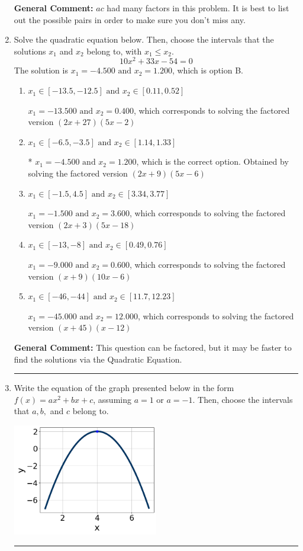 \documentclass{extbook}[14pt]
\newcommand{\litem}[1]{\item #1

\rule{\textwidth}{0.4pt}}
\begin{document}
\begin{enumerate}
{\textbf{General Comment:} $ac$ had many factors in this problem. It is best to list out the possible pairs in order to make sure you don't miss any.
}
\litem{
Solve the quadratic equation below. Then, choose the intervals that the solutions $x_1$ and $x_2$ belong to, with $x_1 \leq x_2$.
\[ 10x^{2} +33 x -54 = 0 \]The solution is \( x_1 = -4.500 \text{ and } x_2 = 1.200 \), which is option B.\begin{enumerate}[label=\Alph*.]
\item \( x_1 \in [-13.5, -12.5] \text{ and } x_2 \in [0.11, 0.52] \)

$x_1 = -13.500 \text{ and } x_2 = 0.400$, which corresponds to solving the factored version $(2x + 27)(5x -2)$
\item \( x_1 \in [-6.5, -3.5] \text{ and } x_2 \in [1.14, 1.33] \)

* $x_1 = -4.500 \text{ and } x_2 = 1.200$, which is the correct option. Obtained by solving the factored version $(2x + 9)(5x -6)$
\item \( x_1 \in [-1.5, 4.5] \text{ and } x_2 \in [3.34, 3.77] \)

$x_1 = -1.500 \text{ and } x_2 = 3.600$, which corresponds to solving the factored version $(2x + 3)(5x -18)$
\item \( x_1 \in [-13, -8] \text{ and } x_2 \in [0.49, 0.76] \)

$x_1 = -9.000 \text{ and } x_2 = 0.600$, which corresponds to solving the factored version $(x + 9)(10x -6)$
\item \( x_1 \in [-46, -44] \text{ and } x_2 \in [11.7, 12.23] \)

$x_1 = -45.000 \text{ and } x_2 = 12.000$, which corresponds to solving the factored version $(x + 45)(x -12)$
\end{enumerate}

\textbf{General Comment:} This question can be factored, but it may be faster to find the solutions via the Quadratic Equation.
}
\litem{
Write the equation of the graph presented below in the form $f(x)=ax^2+bx+c$, assuming  $a=1$ or $a=-1$. Then, choose the intervals that $a, b,$ and $c$ belong to.

\begin{center}
    \includegraphics[width=0.5\textwidth]{../Figures/quadraticGraphToEquationCopyC.png}
\end{center}


}
\end{enumerate}
\end{document}

